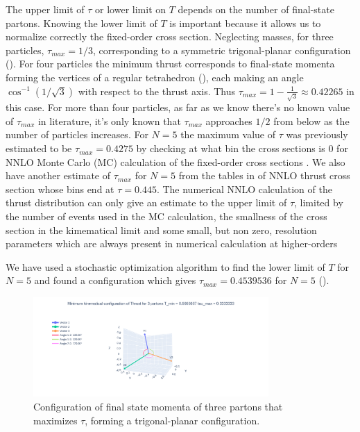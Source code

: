 \documentclass[../Tesi_Jiahao_Miao_986136.tex]{subfiles}
\begin{document}
The upper limit of $\tau$ or lower limit on $T$ depends on the number of final-state partons.
Knowing the lower limit of $T$ is important because it allows us to normalize correctly the fixed-order cross section.
Neglecting masses, for three particles, $\tau_{max} = 1/3$, corresponding to a symmetric trigonal-planar configuration ().
For four particles the minimum thrust corresponds to final-state momenta forming the vertices of a regular tetrahedron (),
each making an angle $\cos^{-1}(1/\sqrt{3})$ with respect to the thrust axis. Thus $\tau_{max} = 1-\frac{1}{\sqrt{3}} \approx 0.42265$ in this
case. For more than four particles, as far as we know there's no known value of $\tau_{max}$ in literature, it's only known that $\tau_{max}$ approaches $1/2$ 
from below as the number of particles increases. For $N=5$ the maximum value of $\tau$ was previously 
estimated to be $\tau_{max} = 0.4275$ by checking at what bin the cross sections is 0 for NNLO Monte Carlo (MC) calculation of the fixed-order cross sections \cite{Monni:2011gb}.
We also have another estimate of $\tau_{max}$ for $N=5$ from the tables in \cite{Weinzierl_2009} of NNLO thrust cross section  whose 
bins end at $\tau = 0.445$. The numerical NNLO calculation of the thrust distribution can only give an estimate to the upper limit of $\tau$, limited
by the number of events used in the MC calculation, the smallness of the cross section in the kimematical limit and some small, but non zero, resolution
parameters which are always present in numerical calculation at higher-orders

We have used a stochastic optimization algorithm to find the lower limit of $T$ for $N=5$ and found a configuration which gives $\tau_{max} = 0.4539536 $ 
for $N=5$ ().
 
\begin{figure}
    \centering
    \includegraphics[width=0.8\textwidth]{figures/3_parton.png}
    \caption{Configuration of final state momenta of three partons that maximizes $\tau$, forming a trigonal-planar configuration.} 
    \label{fig:3_parton}
\end{figure}
\end{document}
